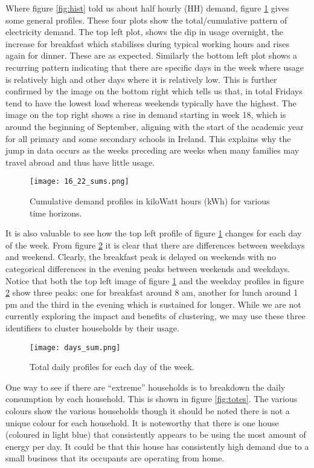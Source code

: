 Where figure \ref{fig:hist} told us about half hourly (HH) demand, figure \ref{fig:sums} gives some general profiles. These four plots show the total/cumulative pattern of electricity demand. The top left plot, shows the dip in usage overnight, the increase for breakfast which stabilises during typical working hours and rises again for dinner. These are as expected. Similarly the bottom left plot shows a recurring pattern indicating that there are specific days in the week where usage is relatively high and other days where it is relatively low. This is further confirmed by the image on the bottom right which tells us that, in total Fridays tend to have the lowest load whereas weekends typically have the highest. The image on the top right shows a rise in demand starting in week 18, which is around the beginning of September, aligning with the start of the academic year for all primary and some secondary schools in Ireland. This explains why the jump in data occurs as the weeks preceding are weeks when many families may travel abroad and thus have little usage.

\begin{figure}
\centering
\texttt{[image: 16\_22\_sums.png]}
\caption{Cumulative demand profiles in kiloWatt hours (kWh) for various time horizons.}
\label{fig:sums} 
\end{figure}

It is also valuable to see how the top left profile of figure \ref{fig:sums} changes for each day of the week. From figure \ref{fig:days} it is clear that there are differences between weekdays and weekend. Clearly, the breakfast peak is delayed on weekends with no categorical differences in the evening peaks between weekends and weekdays. Notice that both the top left image of figure \ref{fig:sums} and the weekday profiles in figure \ref{fig:days} show three peaks: one for breakfast around 8 am, another for lunch around 1 pm and the third in the evening which is sustained for longer. While we are not currently exploring the impact and benefits of clustering, we may use these three identifiers to cluster households by their usage.

\begin{figure}
\centering
\texttt{[image: days\_sum.png]}
\caption{Total daily profiles for each day of the week.}
\label{fig:days} 
\end{figure}

One way to see if there are ``extreme'' households is to breakdown the daily consumption by each household. This is shown in figure \ref{fig:totes}. The various colours show the various households though it should be noted there is not a unique colour for each household. It is noteworthy that there is one house (coloured in light blue) that consistently appears to be using the most amount of energy per day. It could be that this house has consistently high demand due to a small business that its occupants are operating from home.

